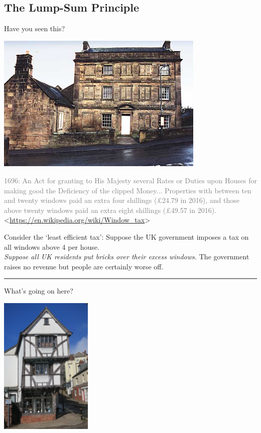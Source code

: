 \documentclass[]{article}
\begin{document}
\hypertarget{the-lump-sum-principle}{%
\subsection{The Lump-Sum Principle}\label{the-lump-sum-principle}}

Have you seen this?

\includegraphics[height=2.6in]{picsfigs/ukwindows.jpg}

\textcolor{gray}{1696: An Act for granting to His Majesty several Rates or Duties upon Houses for making good the Deficiency of the clipped Money...
Properties with between ten and twenty windows paid an extra four shillings (£24.79 in 2016), and those above twenty windows paid an extra eight shillings (£49.57 in 2016).}
\textless{}\url{https://en.wikipedia.org/wiki/Window_tax}\textgreater{}

Consider the `least efficient tax': Suppose the UK government imposes a
tax on all windows above 4 per house.\\

\emph{Suppose all UK residents put bricks over their excess windows.}
The government raises no revenue but people are certainly worse off.

\begin{center}\rule{0.5\linewidth}{\linethickness}\end{center}

What's going on here?

\includegraphics[height=2.6in]{picsfigs/tudoroverhang.jpg}
\end{document}
